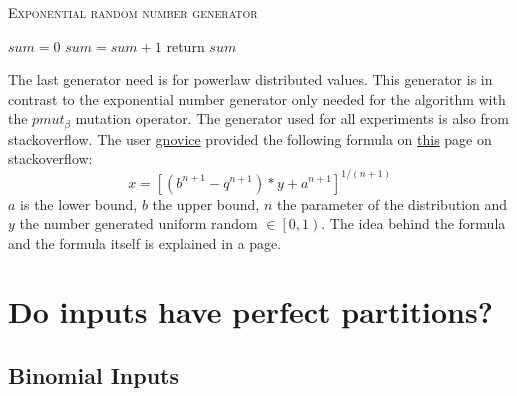 \begin{algorithm}[bt]
      \caption{\textsc{Exponential random number generator}}\label{alg:exponentialRNG}

      \DontPrintSemicolon %
      $sum = 0$\; \tcp{random() generates a random value $\in \left[0, 1\right)$}
      {
            $sum = sum+1$\;
      }
      return $sum$\;
\end{algorithm}

The last generator need is for powerlaw distributed values. This generator is in contrast to the exponential number generator only needed for the algorithm with the $pmut_\beta$ mutation operator. The generator used for all experiments is also from stackoverflow. The user \href{https://stackoverflow.com/users/52738/gnovice}{gnovice} provided the following formula on \href{https://stackoverflow.com/questions/918736/random-number-generator-that-produces-a-power-law-distribution}{this} page on stackoverflow: 
\[
      x = {[(b^{n+1} - q^{n+1})*y + a^{n+1}]}^{1/(n+1)}      
\]
$a$ is the lower bound, $b$ the upper bound, $n$ the parameter of the distribution and $y$ the number generated uniform random $\in \left[0, 1\right)$. The idea behind the formula and the formula itself is explained in a  page.


\section{Do inputs have perfect partitions?}
\subsection{Binomial Inputs}

